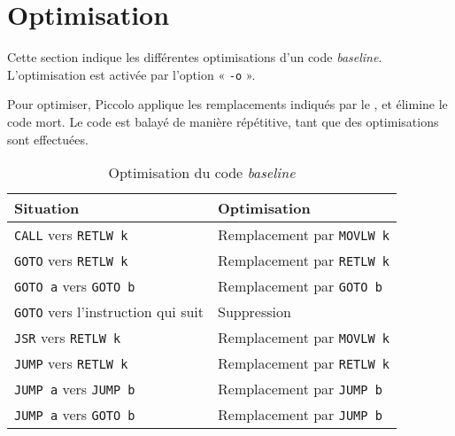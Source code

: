 \section{Optimisation}

Cette section indique les différentes optimisations d'un code \emph{baseline}. L'optimisation est activée par l'option « \texttt{-o} ».

Pour optimiser, Piccolo applique les remplacements indiqués par le , et élimine le code mort. Le code est balayé de manière répétitive, tant que des optimisations sont effectuées.

\begin{table}[!ht]
  \centering
  \small
  \begin{tabular}{ll}
    \textbf{Situation} & \textbf{Optimisation} \\
    \hline
    \texttt{CALL} vers \texttt{RETLW k}  & Remplacement par \texttt{MOVLW k}\\
    \texttt{GOTO} vers \texttt{RETLW k}  & Remplacement par \texttt{RETLW k}\\
    \texttt{GOTO a} vers \texttt{GOTO b}  & Remplacement par \texttt{GOTO b}\\
    \texttt{GOTO} vers l'instruction qui suit  & Suppression\\
    \texttt{JSR} vers \texttt{RETLW k}  & Remplacement par \texttt{MOVLW k}\\
    \texttt{JUMP} vers \texttt{RETLW k}  & Remplacement par \texttt{RETLW k}\\
    \texttt{JUMP a} vers \texttt{JUMP b}  & Remplacement par \texttt{JUMP b}\\
    \texttt{JUMP a} vers \texttt{GOTO b}  & Remplacement par \texttt{JUMP b}\\
    \hline
  \end{tabular}
  \caption{Optimisation du code \emph{baseline}}
\end{table}

